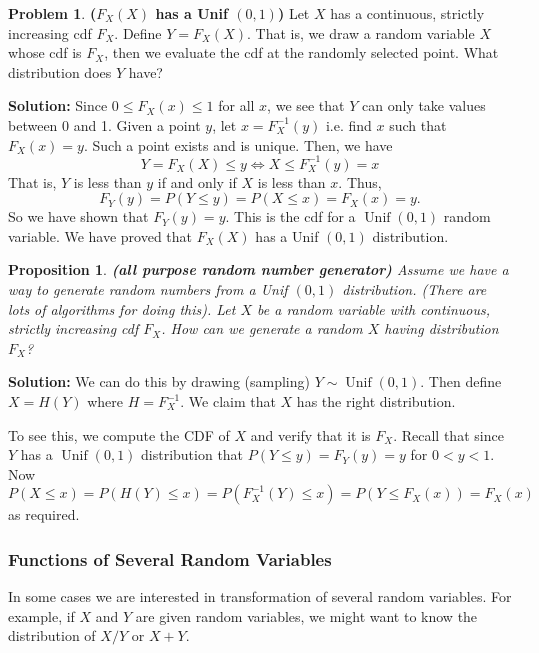 \documentclass[13pt]{article}
\newtheorem{proposition}[theorem]{Proposition}
\theoremstyle{definition}
\newtheorem{problem}[theorem]{Problem}
\newenvironment{solution}
{\color{C2}\begin{framed}\begingroup\textbf{Solution:} }
  {\endgroup\end{framed}}
\theoremstyle{remark}
\begin{document}
\begin{problem}\textbf{($F_{X}(X)$ has a Unif $(0,1)$)} Let $X$ has a continuous, strictly increasing cdf $F_{X}$. Define $Y=F_X(X)$. That is, we draw a random variable $X$ whose cdf is $F_X$, then we evaluate the cdf at the randomly selected point. What distribution does $Y$ have? 
\end{problem}
\begin{solution}
    Since $0 \leq F_X(x) \leq 1$ for all $x$, we see that $Y$ can only take values between 0 and 1. Given a point $y$, let $x=F_{X}^{-1}(y)$ i.e. find $x$ such that $F_{X}(x)=y$. Such a point exists and is unique. Then, we have
    \[
    Y=F_X(X)\le y \Longleftrightarrow X\le F^{-1}_X(y) = x
    \]
    That is, $Y$ is less than $y$ if and only if $X$ is less than $x$. Thus, 
    \[
    F_{Y}(y)=P(Y \leq y)=P(X \leq x)=F_{X}(x)=y.
    \]
    So we have shown that $F_{Y}(y)=y$. This is the cdf for a $\operatorname{Unif}(0,1)$ random variable. We have proved that $F_{X}(X)$ has a Unif $(0,1)$ distribution.
\end{solution}
\begin{proposition}\textbf{(all purpose random number generator)} Assume we have a way to generate random numbers from a Unif $(0,1)$ distribution. (There are lots of algorithms for doing this). Let $X$ be a random variable with continuous, strictly increasing cdf $F_{X}$. How can we generate a random $X$ having distribution $F_{X}$? 
\end{proposition}
\begin{solution}
    {\color{C3} We can do this by drawing (sampling) $Y \sim \operatorname{Unif}(0,1)$. Then define $X=H(Y)$ where $H=F_{X}^{-1}$. We claim that $X$ has the right distribution.}
    
    To see this, we compute the CDF of $X$ and verify that it is $F_{X}$. Recall that since $Y$ has a $\operatorname{Unif}(0,1)$ distribution that $P(Y \leq y)=F_{Y}(y)=y$ for $0<y<1$. Now
$$
P(X \leq x)=P(H(Y) \leq x)=P\left(F_{X}^{-1}(Y) \leq x\right)=P\left(Y \leq F_{X}(x)\right)=F_{X}(x)
$$
as required.
\end{solution}

\subsubsection{Functions of Several Random Variables}
In some cases we are interested in transformation of several random variables. For example, if $X$ and $Y$ are given random variables, we might want to know the distribution of $X / Y$ or $X+Y$. 
\end{document}
